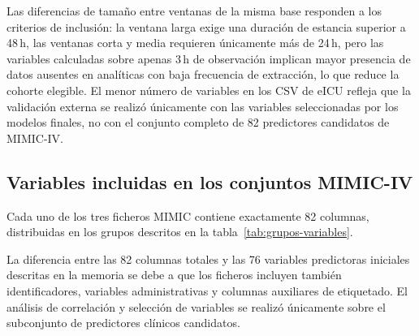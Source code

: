 \documentclass[
  spanish,
  a4paper,
  12pt,
  twoside]{memoir}
\begin{document}
Las diferencias de tamaño entre ventanas de la misma base responden a los criterios de inclusión: la ventana larga exige una duración de estancia superior a 48\,h, las ventanas corta y media requieren únicamente más de 24\,h, pero las variables calculadas sobre apenas 3\,h de observación implican mayor presencia de datos ausentes en analíticas con baja frecuencia de extracción, lo que reduce la cohorte elegible. El menor número de variables en los CSV de eICU refleja que la validación externa se realizó únicamente con las variables seleccionadas por los modelos finales, no con el conjunto completo de 82 predictores candidatos de MIMIC-IV.
 
\subsection*{Variables incluidas en los conjuntos MIMIC-IV}
 
Cada uno de los tres ficheros MIMIC contiene exactamente 82 columnas, distribuidas en los grupos descritos en la tabla~\ref{tab:grupos-variables}.

La diferencia entre las 82 columnas totales y las 76 variables predictoras iniciales descritas en la memoria se debe a que los ficheros incluyen también identificadores, variables administrativas y columnas auxiliares de etiquetado. El análisis de correlación y selección de variables se realizó únicamente sobre el subconjunto de predictores clínicos candidatos.
 
\end{document}
